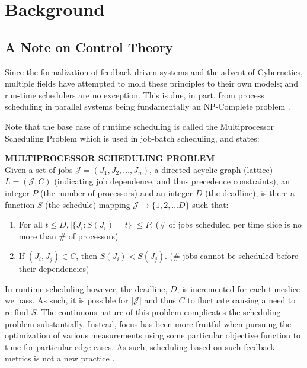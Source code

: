 \chapter{Background}
%
\label{chap:background}

\section{A Note on Control Theory}
\label{sec:a note on control theory}

Since the formalization of feedback driven systems and the advent of 
Cybernetics, multiple fields have attempted to mold these principles to their 
own models; and run-time schedulers are no exception. This is due, in part, from
process scheduling in parallel systems being fundamentally an NP-Complete 
problem \cite{bruno1976computer}. 

Note that the base case of runtime scheduling is called the Multiprocessor 
Scheduling Problem which is used in job-batch scheduling, and states:
\begin{newdef}
    {\bf MULTIPROCESSOR SCHEDULING PROBLEM}\\ 
    Given a set of jobs $\mathscr{J} = (J_1, J_2, \ldots, J_n)$, a directed 
    acyclic graph (lattice) $L = (\mathscr{J}, C)$ (indicating job dependence,
    and thus precedence constraints), an integer $P$ (the number of processors) 
    and an integer $D$ (the deadline), is there a function $S$ (the schedule)
    mapping $\mathscr{J} \rightarrow \{1, 2, \ldots D\}$ such that:
    \begin{enumerate}
        \item For all $t \leq D, |\{J_i : S(J_i) = t \}| \leq P$. (\# of jobs scheduled per time slice is no more than \# of processors)
        \item If $(J_i, J_j) \in C$, then $S(J_i) < S(J_j)$. (\# jobs cannot be scheduled before their dependencies)
    \end{enumerate}
\end{newdef}
\noindent
In runtime scheduling however, the deadline, $D$, is incremented for each timeslice we
pass. As such, it is possible for $|\mathscr{J}|$ and thus $C$ to fluctuate 
causing a need to re-find $S$. The continuous nature of this problem complicates 
the scheduling problem substantially.
Instead, focus has been more fruitful when pursuing the optimization of various 
measurements using some particular objective function 
\cite{garey1978performance} 
to tune for particular edge cases. As such, scheduling based on such feedback 
metrics is not a new practice \cite{dietz1997use}.

